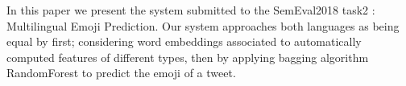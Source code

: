 In this paper we present the system submitted to the SemEval2018 task2 : Multilingual Emoji Prediction. Our system approaches both languages as being equal by first; considering word embeddings associated to automatically computed features of different types, then by applying bagging algorithm RandomForest to predict the emoji of a tweet.
